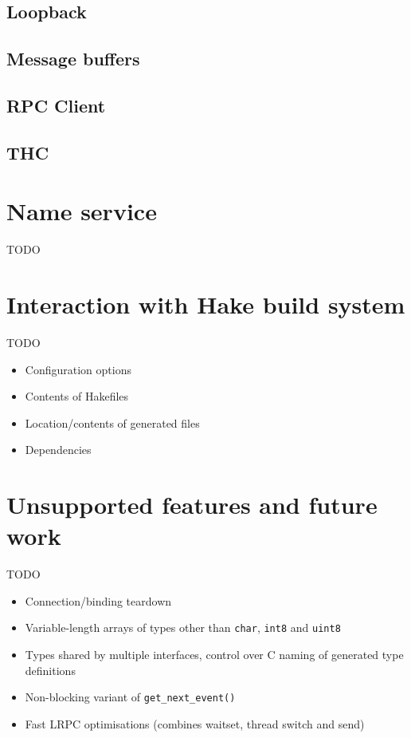 \documentclass[a4paper,twoside]{report} %
\begin{document}
\section{Loopback}

\section{Message buffers}

\section{RPC Client}
\label{sec:rpcclient}

\section{THC}
\label{sec:thc}


\chapter{Name service}
\label{cha:nameservice}

TODO


\chapter{Interaction with Hake build system}
\label{cha:hake}

TODO

\begin{itemize}
 \item Configuration options
 \item Contents of Hakefiles
 \item Location/contents of generated files
 \item Dependencies
\end{itemize}


\chapter{Unsupported features and future work}

TODO

\begin{itemize}
 \item Connection/binding teardown
 \item Variable-length arrays of types other than \lstinline+char+,
        \lstinline+int8+ and \lstinline+uint8+
 \item Types shared by multiple interfaces, control over C naming of generated
        type definitions
 \item Non-blocking variant of \lstinline+get_next_event()+
 \item Fast LRPC optimisations (combines waitset, thread switch and send)
\end{itemize}

 

\end{document}
